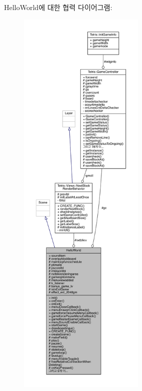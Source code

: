 Hello\+World에 대한 협력 다이어그램\+:
\nopagebreak
\begin{figure}[H]
\begin{center}
\leavevmode
\includegraphics[height=550pt]{d9/d20/class_hello_world__coll__graph}
\end{center}
\end{figure}
